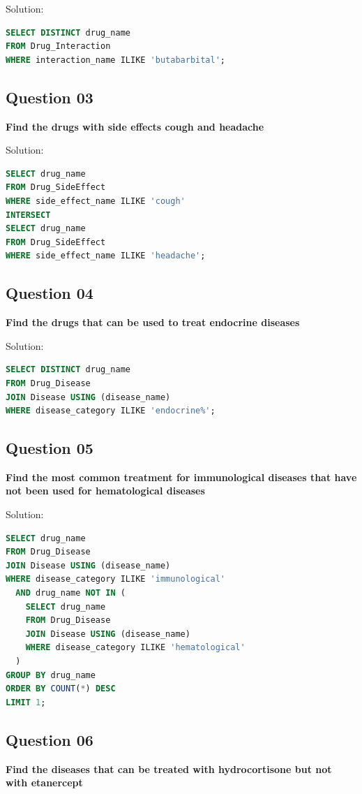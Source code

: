 \documentclass[12pt,a4paper]{article}
\begin{document}
Solution:
\begin{lstlisting}[language=SQL]
SELECT DISTINCT drug_name
FROM Drug_Interaction
WHERE interaction_name ILIKE 'butabarbital';
\end{lstlisting}

\subsection{Question 03}
\textbf{Find the drugs with side effects cough and headache}

Solution:
\begin{lstlisting}[language=SQL]
SELECT drug_name
FROM Drug_SideEffect
WHERE side_effect_name ILIKE 'cough'
INTERSECT
SELECT drug_name
FROM Drug_SideEffect
WHERE side_effect_name ILIKE 'headache';
\end{lstlisting}

\subsection{Question 04}
\textbf{Find the drugs that can be used to treat endocrine diseases}

Solution:
\begin{lstlisting}[language=SQL]
SELECT DISTINCT drug_name
FROM Drug_Disease
JOIN Disease USING (disease_name)
WHERE disease_category ILIKE 'endocrine%';
\end{lstlisting}

\subsection{Question 05}
\textbf{Find the most common treatment for immunological diseases that have not been used for hematological diseases}

Solution:
\begin{lstlisting}[language=SQL]
SELECT drug_name
FROM Drug_Disease
JOIN Disease USING (disease_name)
WHERE disease_category ILIKE 'immunological'
  AND drug_name NOT IN (
    SELECT drug_name
    FROM Drug_Disease
    JOIN Disease USING (disease_name)
    WHERE disease_category ILIKE 'hematological'
  )
GROUP BY drug_name
ORDER BY COUNT(*) DESC
LIMIT 1;
\end{lstlisting}

\subsection{Question 06}
\textbf{Find the diseases that can be treated with hydrocortisone but not with etanercept}
\end{document}

